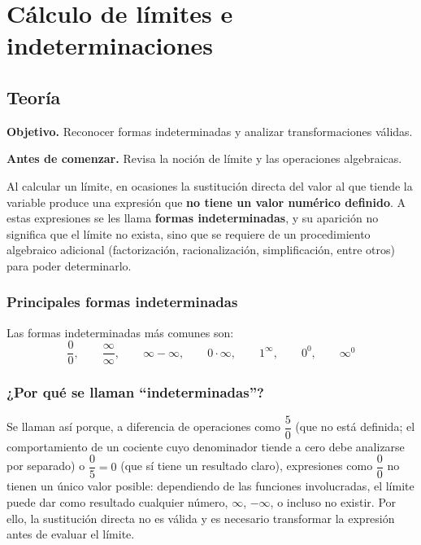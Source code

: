 \documentclass[12pt]{article}
\begin{document}
\section{Cálculo de límites e indeterminaciones}

\subsection{Teoría}

\textbf{Objetivo.} Reconocer formas indeterminadas y analizar transformaciones válidas.

\textbf{Antes de comenzar.} Revisa la noción de límite y las operaciones algebraicas.


Al calcular un límite, en ocasiones la sustitución directa del valor al que tiende la variable produce una expresión que \textbf{no tiene un valor numérico definido}. A estas expresiones se les llama \textbf{formas indeterminadas}, y su aparición no significa que el límite no exista, sino que se requiere de un procedimiento algebraico adicional (factorización, racionalización, simplificación, entre otros) para poder determinarlo.



\subsubsection{Principales formas indeterminadas}


Las formas indeterminadas más comunes son:
\[
\frac{0}{0}, \qquad \frac{\infty}{\infty}, \qquad \infty - \infty, \qquad 0 \cdot \infty, \qquad 1^{\infty}, \qquad 0^0, \qquad \infty^0
\]



\subsubsection{¿Por qué se llaman ``indeterminadas''?}


Se llaman así porque, a diferencia de operaciones como $\dfrac{5}{0}$ (que no está definida; el comportamiento de un cociente cuyo denominador tiende a cero debe analizarse por separado) o $\dfrac{0}{5} = 0$ (que sí tiene un resultado claro), expresiones como $\dfrac{0}{0}$ no tienen un único valor posible: dependiendo de las funciones involucradas, el límite puede dar como resultado cualquier número, $\infty$, $-\infty$, o incluso no existir. Por ello, la sustitución directa no es válida y es necesario transformar la expresión antes de evaluar el límite.
\end{document}
